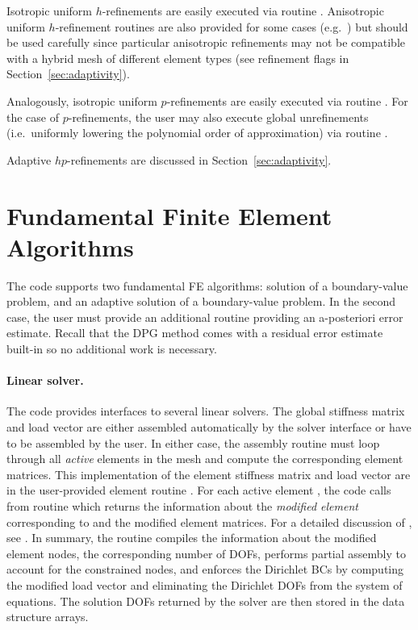 Isotropic uniform $h$-refinements are easily executed via routine . Anisotropic uniform $h$-refinement routines are also provided for some cases (e.g.~) but should be used carefully since particular anisotropic refinements may not be compatible with a hybrid mesh of different element types (see refinement flags in Section~\ref{sec:adaptivity}). 

Analogously, isotropic uniform $p$-refinements are easily executed via routine . For the case of $p$-refinements, the user may also execute global unrefinements (i.e.~uniformly lowering the polynomial order of approximation) via routine .

Adaptive $hp$-refinements are discussed in Section~\ref{sec:adaptivity}.

\section{Fundamental Finite Element Algorithms}
\label{sec:FE_algorithms}
The code supports two fundamental FE algorithms: solution of a boundary-value problem, and an adaptive solution of a boundary-value problem. In the second case, the user must provide an additional routine providing an a-posteriori error estimate. Recall that the DPG method comes with a residual error estimate built-in so no additional work is necessary.

\paragraph{Linear solver.}

The code provides interfaces to several linear solvers. The global stiffness matrix and load vector are either assembled automatically by the solver interface or have to be assembled by the user. In either case, the assembly routine must loop through all {\em active} elements in the mesh and compute the corresponding element matrices. This implementation of the element stiffness matrix and load vector are in the user-provided element routine . For each active element , the code calls  from routine  which returns the information about the {\em modified element} corresponding to  and the modified element matrices. For a detailed discussion of , see \cite{hpbook,hpbook2}. In summary, the  routine compiles the information about the modified element nodes, the corresponding number of DOFs, performs partial assembly to account for the constrained nodes, and enforces the Dirichlet BCs by computing the modified load vector and eliminating the Dirichlet DOFs from the system of equations. The solution DOFs returned by the solver are then stored in the data structure arrays.


